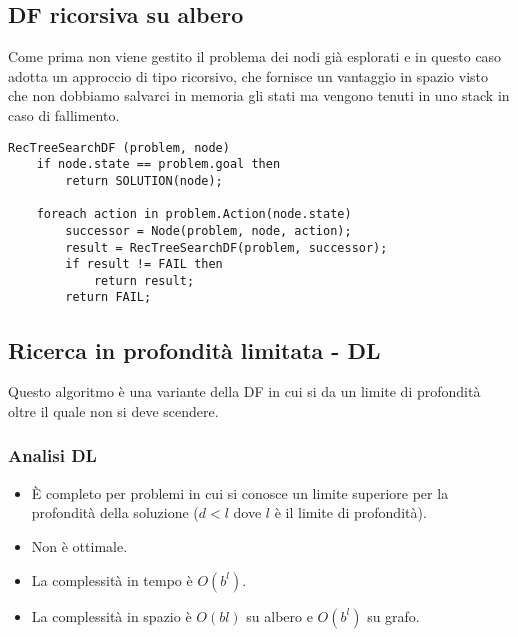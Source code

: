 \subsection{DF ricorsiva su albero}
Come prima non viene gestito il problema dei nodi gi\`a esplorati e in questo caso adotta un
approccio di tipo ricorsivo, che fornisce un vantaggio in spazio visto che non dobbiamo
salvarci in memoria gli stati ma vengono tenuti in uno stack in caso di fallimento.
\begin{lstlisting}[style=pseudo-style]
RecTreeSearchDF (problem, node)
	if node.state == problem.goal then
		return SOLUTION(node);

	foreach action in problem.Action(node.state)
		successor = Node(problem, node, action);
		result = RecTreeSearchDF(problem, successor);
		if result != FAIL then
			return result;
		return FAIL;
\end{lstlisting}

\subsection{Ricerca in profondit\`a limitata - DL}
Questo algoritmo \`e una variante della DF in cui si da un limite di profondit\`a oltre
il quale non si deve scendere.

\subsubsection{Analisi DL}
\begin{itemize}
	\item \`E completo per problemi in cui si conosce un limite superiore per la profondit\`a
	      della soluzione ($d < l$ dove $l$ \`e il limite di profondit\`a).
	\item Non \`e ottimale.
	\item La complessit\`a in tempo \`e $O(b^l)$.
	\item La complessit\`a in spazio \`e $O(bl)$ su albero e $O(b^l)$ su grafo.
\end{itemize}

